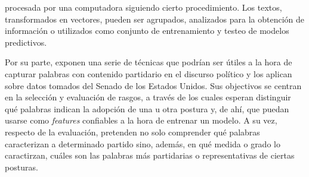 procesada por una computadora siguiendo cierto procedimiento.
Los textos, transformados en vectores, pueden ser agrupados,
analizados para la obtenci\'on de informaci\'on o utilizados
como conjunto de entrenamiento y testeo de modelos predictivos.
\par
Por su parte, \cite{monroe2008fightin} exponen una serie de t\'ecnicas
que podr\'ian ser \'utiles a la hora de capturar palabras con contenido partidario
en el discurso pol\'itico y los aplican sobre datos tomados del Senado de los Estados
Unidos. Sus objectivos se centran en la selecci\'on y evaluaci\'on de rasgos, a trav\'es
de los cuales esperan distinguir qu\'e palabras indican la adopci\'on de una u otra postura
y, de ah\'i, que puedan usarse como \textit{features} confiables a la hora de entrenar un
modelo. A su vez, respecto de la evaluaci\'on, pretenden no solo comprender qu\'e
palabras caracterizan a determinado partido sino, adem\'as, en qu\'e medida o grado
lo caractirzan, cu\'ales son las palabras m\'as partidarias o representativas de ciertas
posturas.
